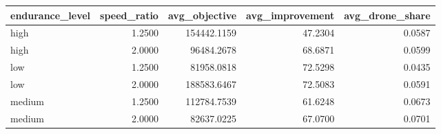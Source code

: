 \begin{tabular}{lrrrr}
\toprule
endurance_level & speed_ratio & avg_objective & avg_improvement & avg_drone_share \\
\midrule
high & 1.2500 & 154442.1159 & 47.2304 & 0.0587 \\
high & 2.0000 & 96484.2678 & 68.6871 & 0.0599 \\
low & 1.2500 & 81958.0818 & 72.5298 & 0.0435 \\
low & 2.0000 & 188583.6467 & 72.5083 & 0.0591 \\
medium & 1.2500 & 112784.7539 & 61.6248 & 0.0673 \\
medium & 2.0000 & 82637.0225 & 67.0700 & 0.0701 \\
\bottomrule
\end{tabular}
